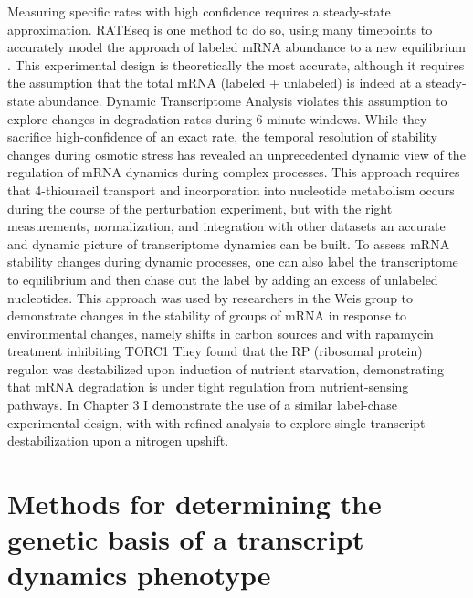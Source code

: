 {Measuring specific rates with high confidence
requires a steady-state approximation. RATEseq is one method to do so,
using many timepoints to accurately model the approach of labeled mRNA
abundance to a new equilibrium 
\parencite{neymotin2014determination}. This
experimental design is theoretically the most accurate, although it
requires the assumption that the total mRNA (labeled + unlabeled) is
indeed at a steady-state abundance. Dynamic Transcriptome Analysis
\parencite{miller2011dynamic}
violates this assumption to explore changes in
degradation rates during 6 minute windows. While they sacrifice
high-confidence of an exact rate, the temporal resolution of stability
changes during osmotic stress has revealed an unprecedented dynamic
view of the regulation of mRNA dynamics during complex processes. This
approach requires that 4-thiouracil transport and incorporation into
nucleotide metabolism occurs during the course of the perturbation
experiment, but with the right measurements, normalization, and
integration with other datasets an accurate and dynamic picture of
transcriptome dynamics can be built. To assess mRNA stability changes
during dynamic processes, one can also label the transcriptome to
equilibrium and then chase out the label by adding an excess of
unlabeled nucleotides. This approach was used by researchers in the
Weis group to demonstrate changes in the stability of groups of mRNA
in response to environmental changes, namely shifts in carbon sources
and with rapamycin treatment inhibiting TORC1
\parencite{munchel2011dynamic}
They found that the RP (ribosomal protein) regulon was destabilized
upon induction of nutrient starvation, demonstrating that mRNA
degradation is under tight regulation from nutrient-sensing pathways.
In Chapter 3 I demonstrate the use of a similar label-chase
experimental design, with with refined analysis to explore
single-transcript destabilization upon a nitrogen upshift.  

\section{Methods for determining the genetic basis of a transcript
dynamics phenotype}

}
